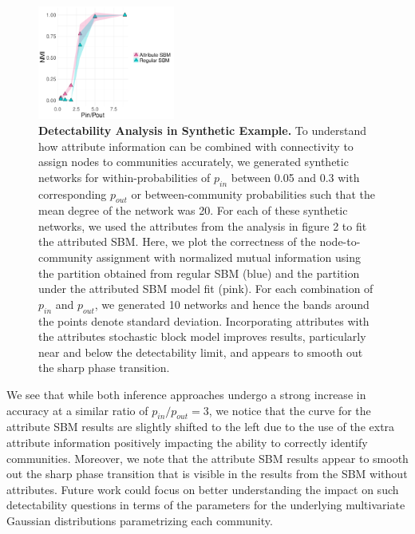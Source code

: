 \documentclass[journal]{IEEEtran}
\begin{document}
\begin{figure}[h!]
\begin{center}
\includegraphics[width=0.4\textwidth]{DetectExp.pdf}
\caption{{\bf Detectability Analysis in Synthetic Example.} To understand how attribute information can be combined with connectivity to assign nodes to communities accurately, we generated synthetic networks for within-probabilities of $p_{in}$ between 0.05 and 0.3 with corresponding $p_{out}$ or between-community probabilities such that the mean degree of the network was 20. For each of these synthetic networks, we used the attributes from the analysis in figure 2 to fit the attributed SBM. Here, we plot the correctness of the node-to-community assignment with normalized mutual information using the partition obtained from regular SBM (blue) and the partition under the attributed SBM model fit (pink). For each combination of $p_{in}$ and $p_{out}$, we generated 10 networks and hence the bands around the points denote standard deviation. Incorporating attributes with the attributes stochastic block model improves results, particularly near and below the detectability limit, and appears to smooth out the sharp phase transition. }
\end{center}
\end{figure}

We see that while both inference approaches undergo a strong increase in accuracy at a similar ratio of $p_{in}/p_{out}=3$, we notice that the curve for the attribute SBM results are slightly shifted to the left due to the use of the extra attribute information positively impacting the ability to correctly identify communities. Moreover, we note that the attribute SBM results appear to smooth out the sharp phase transition that is visible in the results from the SBM without attributes. Future work could focus on better understanding the impact on such detectability questions in terms of the parameters for the underlying multivariate Gaussian distributions parametrizing each community. %
\end{document}
